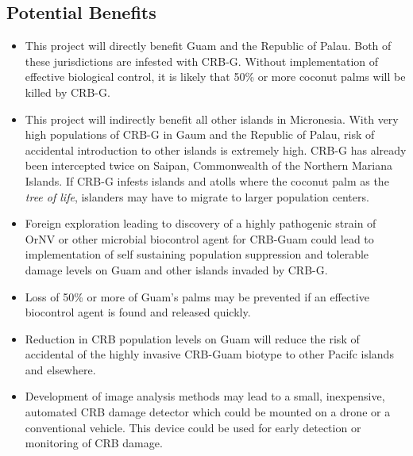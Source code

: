 \documentclass[12pt,letterpaper,english,bibliography=totocnumbered, abstract=on]{scrartcl}
\begin{document}
\subsection{Potential Benefits}
\begin{itemize}
\item This project will directly benefit Guam and the Republic of Palau.
Both of these jurisdictions are infested with CRB-G. Without implementation
of effective biological control, it is likely that 50\% or more coconut
palms will be killed by CRB-G.
\item This project will indirectly benefit all other islands in Micronesia.
With very high populations of CRB-G in Gaum and the Republic of Palau,
risk of accidental introduction to other islands is extremely high.
CRB-G has already been intercepted twice on Saipan, Commonwealth of
the Northern Mariana Islands. If CRB-G infests islands and atolls
where the coconut palm as the \emph{tree of life}, islanders may have
to migrate to larger population centers.
\item Foreign exploration leading to discovery of a highly pathogenic strain
of OrNV or other microbial biocontrol agent for CRB-Guam could lead
to implementation of self sustaining population suppression and tolerable
damage levels on Guam and other islands invaded by CRB-G. 
\item Loss of 50\% or more of Guam's palms may be prevented if an effective
biocontrol agent is found and released quickly. 
\item Reduction in CRB population levels on Guam will reduce the risk of
accidental of the highly invasive CRB-Guam biotype to other Pacifc
islands and elsewhere. 
\item Development of image analysis methods may lead to a small, inexpensive,
automated CRB damage detector which could be mounted on a drone or
a conventional vehicle. This device could be used for early detection
or monitoring of CRB damage.
\end{itemize}
\end{document}

